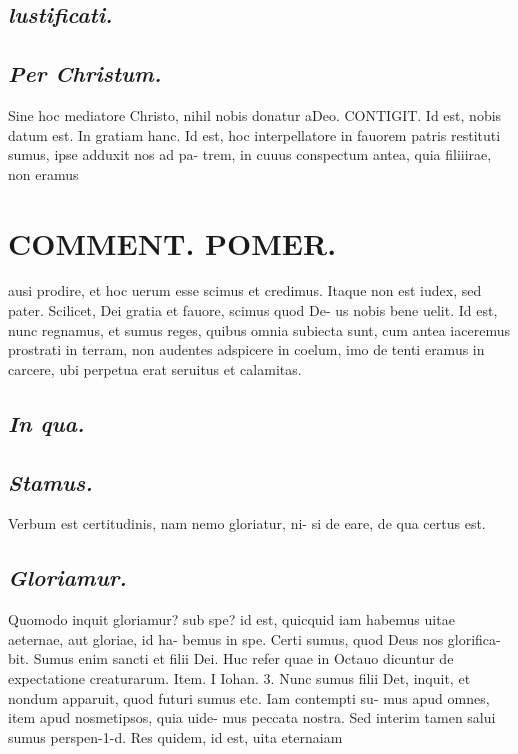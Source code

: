 \documentclass{article}
\begin{document}
\begin{pages}
\subsection*{\textit{lustificati. }}
{}
\subsection*{\textit{Per Christum. }}\pstart Sine hoc mediatore Christo, nihil nobis donatur aDeo. CONTIGIT. Id est, nobis datum est.   \pend\pstart In gratiam hanc. Id est, hoc interpellatore in fauorem patris restituti sumus, ipse adduxit nos ad pa- trem, in cuuus conspectum antea, quia filiiirae, non eramus  \pend
\section*{COMMENT. POMER.  }\pstart ausi prodire, et hoc uerum esse scimus et credimus. Itaque non est iudex, sed pater.  \pend\pstart Scilicet, Dei gratia et fauore, scimus quod De- us nobis bene uelit.   \pend\pstart Id est, nunc regnamus, et sumus reges, quibus omnia subiecta sunt, cum antea iaceremus prostrati in terram, non audentes adspicere in coelum, imo de tenti eramus in carcere, ubi perpetua erat seruitus et calamitas.   \pend
{}
{}
\subsection*{\textit{In qua. }}
{}
\subsection*{\textit{Stamus. }}\pstart Verbum est certitudinis, nam nemo gloriatur, ni- si de eare, de qua certus est.   \pend
{}
{}
\subsection*{\textit{Gloriamur. }}\pstart Quomodo inquit gloriamur? sub spe? id est, quicquid iam habemus uitae aeternae, aut gloriae, id ha- bemus in spe. Certi sumus, quod Deus nos glorifica- bit. Sumus enim sancti et filii Dei. Huc refer quae in Octauo dicuntur de expectatione creaturarum. Item. I Iohan. 3. Nunc sumus filii Det, inquit, et nondum apparuit, quod futuri sumus etc. Iam contempti su- mus apud omnes, item apud nosmetipsos, quia uide- mus peccata nostra. Sed interim tamen salui sumus perspen-1-d. Res quidem, id est, uita eternaiam  \pend
{}
{}

\end{pages}
\end{document}

